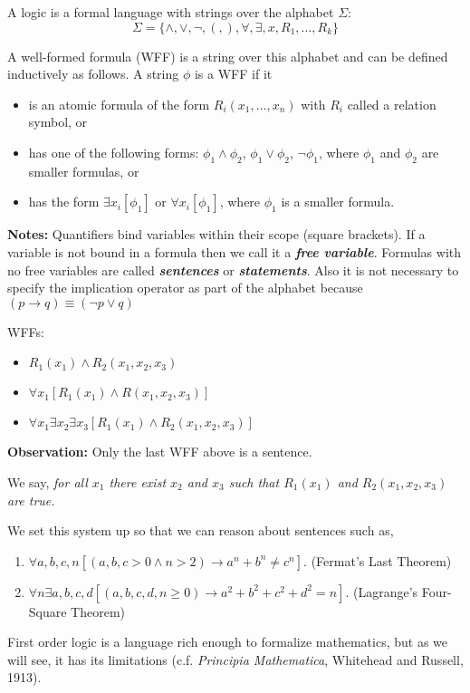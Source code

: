 \documentclass[a4paper,blends,pdf,colorBG,slideColor]{prosper}
\begin{document}
A logic is a formal language with strings over the alphabet $\Sigma$:
\[
\Sigma = \{ \wedge, \vee, \neg, (, ), \forall, \exists, x, R_1, \ldots, R_k \}
\]

A well-formed formula (WFF) is a string over this alphabet and can be defined inductively
as follows.  A string $\phi$ is a WFF if it
\begin{itemize}
\item is an atomic formula of the form $R_i(x_1,\ldots,x_n)$ with $R_i$ called a relation symbol, or
\item has one of the following forms: $\phi_1 \wedge \phi_2$, $\phi_1 \vee \phi_2$, $\neg \phi_1$,
where $\phi_1$ and $\phi_2$ are smaller formulas, or
\item has the form $\exists x_i[\phi_1]$ or $\forall x_i[\phi_1]$, where $\phi_1$ is a smaller formula.
\end{itemize}

{\bf Notes:} Quantifiers bind variables within their scope (square brackets).  If a variable is not
bound in a formula then we call it a {\bf \em free variable}.  Formulas with no free variables are
called {\bf\em sentences} or {\bf\em statements}.  Also it is not necessary to specify the 
implication operator as part of the alphabet because $(p \rightarrow q) \equiv (\neg p \vee q)$
\es

WFFs:
\begin{itemize}
\item $R_1(x_1) \wedge R_2(x_1,x_2,x_3)$
\item $\forall x_1[R_1(x_1) \wedge R(x_1,x_2,x_3)]$
\item$\forall x_1\exists x_2 \exists x_3 [R_1(x_1) \wedge R_2(x_1,x_2,x_3)]$
\end{itemize}

{\bf Observation:} Only the last WFF above is a sentence.

We say, {\em for all $x_1$ there exist $x_2$ and $x_3$ such that $R_1(x_1)$ and 
$R_2(x_1,x_2,x_3)$ are true.}
\es

We set this system up so that we can reason about sentences such as,
\begin{enumerate}
\item $\forall a,b,c,n[(a,b,c > 0 \wedge n > 2) \rightarrow a^n + b^n \ne c^n].$ (Fermat's Last Theorem)
\item $\forall n \exists a,b,c,d[(a,b,c,d,n \ge 0) \rightarrow a^2 + b^2 + c^2 + d^2 = n].$ (Lagrange's Four-Square Theorem)
\end{enumerate}
First order logic  is a language rich enough to
formalize mathematics, but as we will see, it has its limitations (c.f. {\em Principia Mathematica}, Whitehead and Russell, 1913).  
\end{document}
